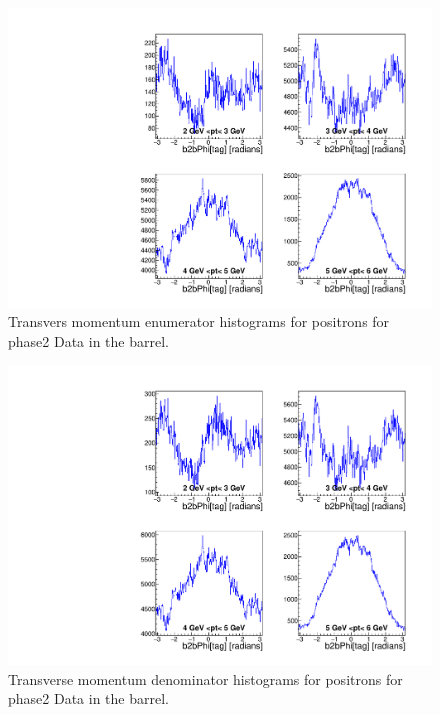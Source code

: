 \documentclass[a4paper,11pt,twosided,final,german,openbib,pdftex,listof=totoc,bibliography=totoc]{scrbook}
\begin{document}
\begin{appendix}
\begin{figure}[!htbp]
	\centering
	\includegraphics[width=\textwidth]{Plots/master/xPtMPhiepBarrelE_Data}
	\caption[Transverse Momentum $\phi$ Positron Barrel Enumerator Histogram Phase2 Data]{Transvers momentum enumerator histograms for positrons for phase2 Data in the barrel.}
	\label{plt:PtMPhiepBarrelE_Data}
\end{figure}







\begin{figure}[!htbp]
	\centering
	\includegraphics[width=\textwidth]{Plots/master/xPtMPhiepBarrelD_Data}
	\caption[Transverse Momentum $\phi$ Positron Barrel Denominator Histogram Phase2 Data]{Transverse momentum denominator histograms for positrons for phase2 Data in the barrel.}
	\label{plt:PtMPhiepBarrelD_Data}
\end{figure}



\end{appendix}
\end{document}

